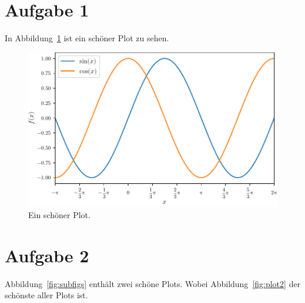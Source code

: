 \documentclass{scrartcl}
\begin{document}
\section*{Aufgabe 1}

In Abbildung~\ref{fig:plot1} ist ein schöner Plot zu sehen.
\blindtext
\begin{figure}
  \centering
  \includegraphics[scale=1]{plot1.pdf}
  \caption{Ein schöner Plot.}
  \label{fig:plot1}
\end{figure}
\blindtext

\section*{Aufgabe 2}

Abbildung~\ref{fig:subfigs} enthält zwei schöne Plots.
Wobei Abbildung~\ref{fig:plot2} der schönste aller Plots ist.
\end{document}

